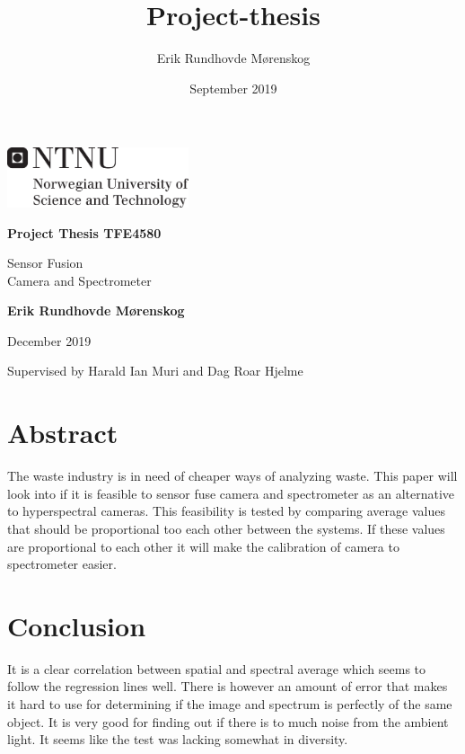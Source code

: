 \documentclass{article}
\title{Project-thesis}
\author{Erik Rundhovde M\o renskog}
\date{September 2019}
\begin{document}
\begin{titlepage}
    
    \includegraphics[width=0.4\textwidth]{figures/ntnu_hovedlogo_eng_svart.png}
    
    \vspace{1cm}
    \huge
    
    \textbf{Project Thesis TFE4580}
 
    \vspace{0.5cm}
    
    Sensor Fusion \\ 
    Camera and Spectrometer
 
    \vspace{1.5cm}
    \Large
    
    \textbf{Erik Rundhovde M\o renskog}

    \vfill

    December 2019
    
    \vspace{0.5cm}

    Supervised by Harald Ian Muri and Dag Roar Hjelme
\end{titlepage}

\singlespacing
\tableofcontents

\section{Abstract}
The waste industry is in need of cheaper ways of analyzing waste. This paper will look into if it is feasible to sensor fuse camera and spectrometer as an alternative to hyperspectral cameras. This feasibility is tested by comparing average values that should be proportional too each other between the systems. If these values are proportional to each other it will make the calibration of camera to spectrometer easier. 











\section{Conclusion}

It is a clear correlation between spatial and spectral average which seems to follow the regression lines well. There is however an amount of error that makes it hard to use for determining if the image and spectrum is perfectly of the same object. It is very good for finding out if there is to much noise from the ambient light. It seems like the test was lacking somewhat in diversity.





\end{document}
